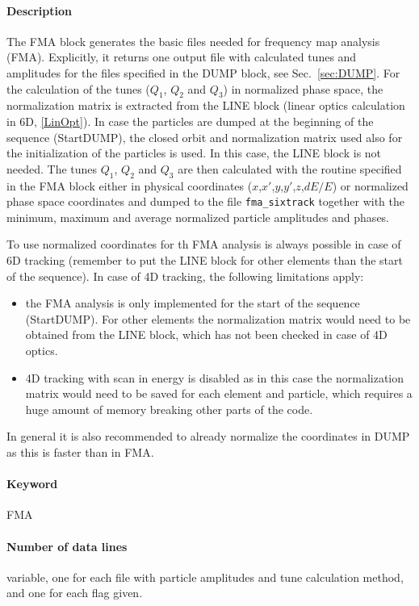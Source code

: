\paragraph{Description}
The FMA block generates the basic files needed for frequency map analysis (FMA). Explicitly, it returns one output file with calculated tunes and amplitudes for the files specified in the DUMP block, see Sec.~\ref{sec:DUMP}. For the calculation of the tunes ($Q_1$, $Q_2$ and $Q_3$) in normalized phase space, the normalization matrix is extracted from the LINE block (linear optics calculation in 6D, \ref{LinOpt}). In case the particles are dumped at the beginning of the sequence (StartDUMP), the closed orbit and normalization matrix used also for the initialization of the particles is used. In this case, the LINE block is not needed. The tunes $Q_1$, $Q_2$ and $Q_3$ are then calculated with the routine specified in the FMA block either in physical coordinates ($x$,$x'$,$y$,$y'$,$z$,$dE/E$) or normalized phase space coordinates and dumped to the file \verb|fma_sixtrack| together with the minimum, maximum and average normalized particle amplitudes and phases.

To use normalized coordinates for th FMA analysis is always possible in case of 6D tracking (remember to put the LINE block for other elements than the start of the sequence). In case of 4D tracking, the following limitations apply:
\begin{itemize}
	\item the FMA analysis is only implemented for the start of the sequence (StartDUMP). For other elements the normalization matrix would need to be obtained from the LINE block, which has not been checked in case of 4D optics.
	\item 4D tracking with scan in energy is disabled as in this case the normalization matrix would need to be saved for each element and particle, which requires a huge amount of memory breaking other parts of the code.	
\end{itemize}
In general it is also recommended to already normalize the coordinates in DUMP as this is faster than in FMA.

\paragraph{Keyword}
FMA

\paragraph{Number of data lines}
variable, one for each file with particle amplitudes and tune calculation method, and one for each flag given.

